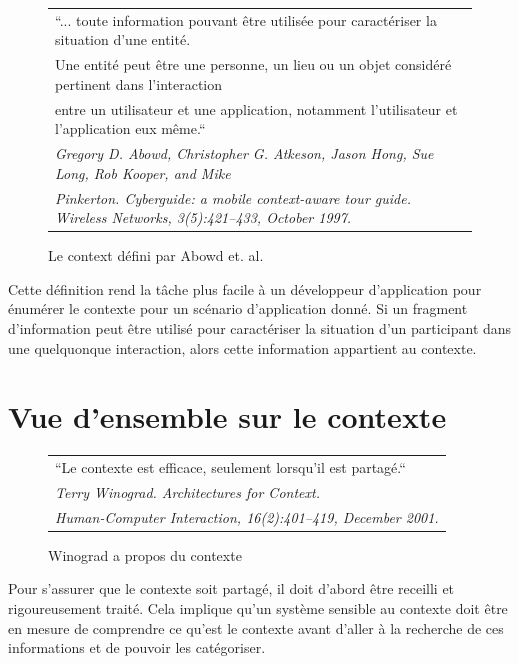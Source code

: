 \begin{figure}[h]
  \centering
  \begin{tabular}{l}
    ``... toute information pouvant être utilisée pour caractériser la
    situation d'une entité.\\
    Une entité peut être une personne, un lieu ou un
    objet considéré pertinent dans l'interaction \\
    entre un utilisateur et une
    application, notamment l'utilisateur et l'application eux même.``
    \cite{abowd_baltzer_1997} \\
    \em \footnotesize Gregory D. Abowd, Christopher G. Atkeson, Jason Hong, Sue
    Long, Rob Kooper, and Mike \\
    \em \footnotesize Pinkerton. Cyberguide: a mobile context-aware tour guide.
    Wireless Networks, 3(5):421–433, October 1997. 
  \end{tabular}
  \caption{Le context défini par Abowd et. al.}
  \label{fig:quote}
\end{figure}

Cette définition rend la tâche plus facile à un développeur d'application pour
énumérer le contexte pour un scénario d'application donné. Si un fragment
d'information peut être utilisé pour caractériser la situation d'un participant
dans une quelquonque interaction, alors cette information appartient au
contexte.

\section{Vue d'ensemble sur le contexte}

\begin{figure}[h]
  \centering
  \begin{tabular}{l}
    ``Le contexte est efficace, seulement lorsqu'il est partagé.``
    \cite{winograd_architectures_2001} \\
    \em \footnotesize Terry Winograd. Architectures for Context. \\
    \em \footnotesize Human-Computer Interaction, 16(2):401–419,
     December 2001. \\
  \end{tabular}
  \caption{Winograd a propos du contexte}
  \label{fig:quote}
\end{figure}

Pour s'assurer que le contexte soit partagé, il doit d'abord être receilli et
rigoureusement traité. Cela implique qu'un système sensible au contexte doit
être en mesure de comprendre ce qu'est le contexte avant d'aller à la recherche
de ces informations et de pouvoir les catégoriser.

